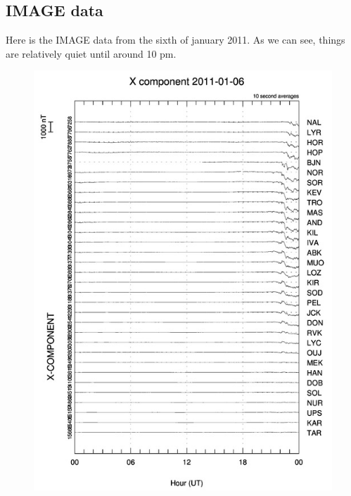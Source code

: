 \documentclass[norsk,a4paper,12pt]{article}
\begin{document}
\begin{multicols}{2}
\subsection{IMAGE data}
Here is the IMAGE data from the sixth of january 2011. As we can see, things are relatively quiet until around 10 pm. 
\begin{figure}[H]
	\includegraphics[scale = 0.9]{Figures/X_gram.jpg}

\end{figure}
\end{multicols}
\end{document}
